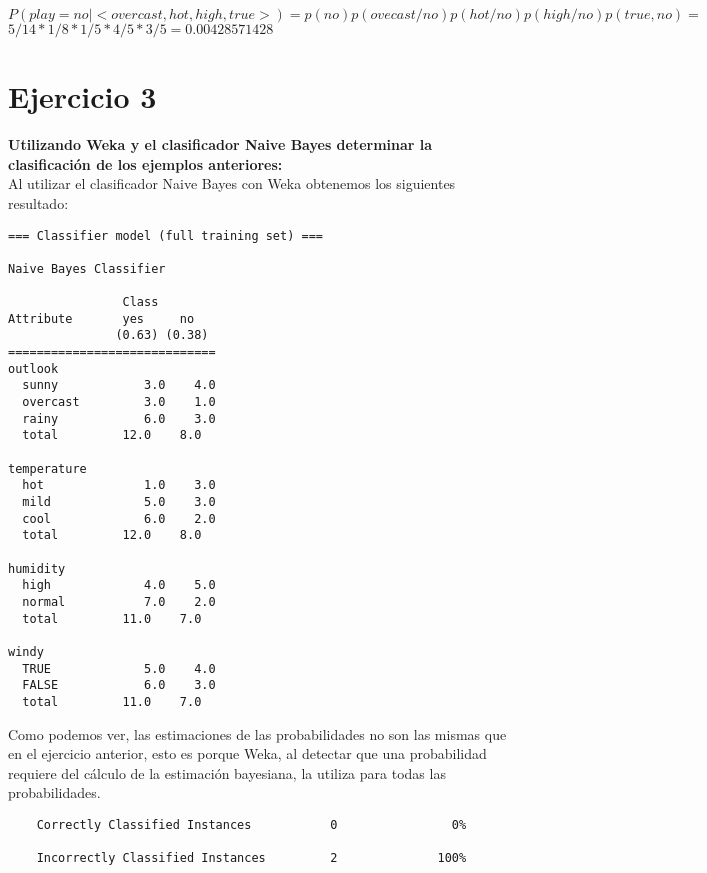 \documentclass{article}
\begin{document}
$P(play = no | <overcast,hot,high,true>) = p(no) p(ovecast/no) p(hot/no) p(high/no) p(true,no) = $ \\

\hspace{1.5cm}$5/14 * 1/8 * 1/5 * 4/5 * 3/5 = 0.00428571428$ \\ 


\newpage

\section{Ejercicio 3}

\textbf{Utilizando Weka y el clasificador Naive Bayes determinar la clasificación de los ejemplos anteriores:} \\

Al utilizar el clasificador Naive Bayes con Weka obtenemos los siguientes resultado:\\

\begin{verbatim}
=== Classifier model (full training set) === 

Naive Bayes Classifier 

                Class 
Attribute		yes     no 
               (0.63) (0.38) 
============================= 
outlook 
  sunny            3.0    4.0 
  overcast         3.0    1.0 
  rainy            6.0    3.0 
  total         12.0    8.0 

temperature 
  hot              1.0    3.0 
  mild             5.0    3.0 
  cool             6.0    2.0 
  total         12.0    8.0 

humidity 
  high             4.0    5.0 
  normal           7.0    2.0 
  total         11.0    7.0 

windy 
  TRUE             5.0    4.0 
  FALSE            6.0    3.0 
  total         11.0    7.0 
\end{verbatim}  
  
Como podemos ver, las estimaciones de las probabilidades no son las mismas que en el ejercicio anterior, esto es porque Weka, al detectar que una probabilidad requiere del cálculo de la estimación bayesiana, la utiliza para todas las probabilidades. \\

\begin{verbatim}
	Correctly Classified Instances           0                0%

	Incorrectly Classified Instances         2              100%  
\end{verbatim}  
\end{document}

